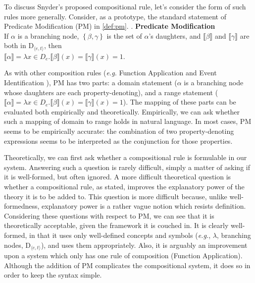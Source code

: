\documentclass[MilwayThesis]{subfiles}
\begin{document}
To discuss Snyder's proposed compositional rule, let's consider the form of such rules more generally.
Consider, as a prototype, the standard statement of Predicate Modification (PM) in \ref{def:pm}.
\ex.\label{def:pm} \textbf{Predicate Modification} \parencite{heimkratzer1998semantics}\\
If $\alpha$ is a branching node, $\left\{ \beta,\gamma \right\}$ is the set of $\alpha$'s daughters, and $\llbracket\beta\rrbracket$ and $\llbracket\gamma\rrbracket$ are both in D$_{\langle e,t\rangle}$, then\\
$\llbracket\alpha\rrbracket = \lambda x \in D_e . \llbracket\beta\rrbracket(x) = \llbracket\gamma\rrbracket(x) = 1$.

As with other composition rules (\textit{e.g.} Function Application \parencite{heimkratzer1998semantics} and Event Identification \parencite{kratzer1996severing}), PM  has two parts: a domain statement ($\alpha$ is a branching node whose daughters are each property-denoting), and a range statement ($\llbracket\alpha\rrbracket = \lambda x \in D_e . \llbracket\beta\rrbracket(x) = \llbracket\gamma\rrbracket(x) = 1$).
The mapping of these parts can be evaluated both empirically and theoretically.
Empirically, we can ask whether such a mapping of domain to range holds in natural language.
In most cases, PM seems to be empirically accurate: the combination of two property-denoting expressions seems to be interpreted as the conjunction for those properties.

Theoretically, we can first ask whether a compositional rule is formulable in our system.
Answering such a question is rarely difficult, simply a matter of asking if it is well-formed, but often ignored.
A more difficult theoretical question is whether a compositional rule, as stated, improves the explanatory power of the theory it is to be added to.
This question is more difficult because, unlike well-formedness, explanatory power is a rather vague notion which resists definition.
Considering these questions with respect to PM, we can see that it is theoretically acceptable, given the framework it is couched in.
It is clearly well-formed, in that it uses only well-defined concepts and symbols (\textit{e.g.}, $\lambda$, branching nodes, D$_{\langle e,t\rangle}$), and uses them appropriately.
Also, it is arguably an improvement upon a system which only has one rule of composition (Function Application).
Although the addition of PM complicates the compositional system, it does so in order to keep the syntax simple.
\end{document}
